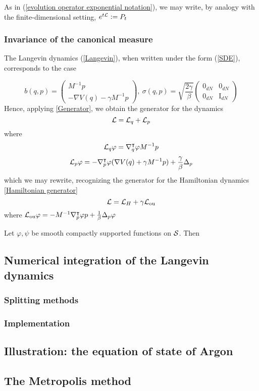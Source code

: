     As in (\ref{evolution operator exponential notation}), we may write, by analogy with the finite-dimensional setting,
    $e^{t\mathcal{L}}\mathrel{\mathop:}= P_t$


    \subsubsection{Invariance of the canonical measure}

    The Langevin dynamics (\ref{Langevin}), when written under the form (\ref{SDE}), corresponds to the case 

    $$ b(q,p)= \begin{pmatrix} M^{-1}p \\ -
    \nabla V(q)-\gamma M^{-1}p\end{pmatrix},\ \sigma(q,p)= \sqrt{\frac{2\gamma}\beta}\begin{pmatrix} 0_{dN} &  0_{dN} \\  0_{dN} & \text{I}_{dN} \end{pmatrix}$$
    Hence, applying \ref{Generator}, we obtain the generator for the dynamics
    $$ \mathcal{L}=  \mathcal{L}_q + \mathcal{L}_p $$
    where
    $$ \mathcal{L}_q \varphi= \nabla^\intercal_q\varphi M^{-1}p$$
    $$ \mathcal{L}_p\varphi =-\nabla^\intercal_{p}\varphi (\nabla V(q)+\gamma M^{-1}p) +\frac{\gamma}{\beta}\Delta_p $$
    which we may rewrite, recognizing the generator for the Hamiltonian dynamics \ref{Hamiltonian generator}
    $$ \mathcal{L}=\mathcal{L}_{H}+\gamma \mathcal{L}_{\text{ou}}$$
    where $\mathcal{L}_{\text{ou}}\varphi =-M^{-1}\nabla^\intercal_p\varphi p + \frac1{\beta}\Delta_p\varphi$

    \begin{lemma}
        Let $\varphi,\psi$ be smooth compactly supported functions on $\mathcal{S}$. Then
    \end{lemma}

\subsection{Numerical integration of the Langevin dynamics}
    \subsubsection{Splitting methods}
    \subsubsection{Implementation}

\subsection{Illustration: the equation of state of Argon}
\subsection{The Metropolis method}